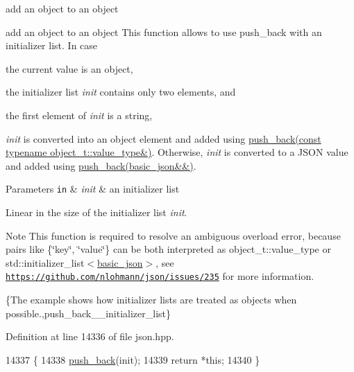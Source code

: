 add an object to an object 

add an object to an object This function allows to use {\ttfamily push\+\_\+back} with an initializer list. In case


\begin{DoxyEnumerate}
\item the current value is an object,
\item the initializer list {\itshape init} contains only two elements, and
\item the first element of {\itshape init} is a string,
\end{DoxyEnumerate}

{\itshape init} is converted into an object element and added using \hyperlink{classnlohmann_1_1basic__json_ae11a3a51782c058fff2f6550cdfb9b3c}{push\+\_\+back(const typename object\+\_\+t\+::value\+\_\+type\&)}. Otherwise, {\itshape init} is converted to a J\+S\+ON value and added using \hyperlink{classnlohmann_1_1basic__json_ac8e523ddc8c2dd7e5d2daf0d49a9c0d7}{push\+\_\+back(basic\+\_\+json\&\&)}.


\begin{DoxyParams}[1]{Parameters}
\mbox{\tt in}  & {\em init} & an initializer list\\
\hline
\end{DoxyParams}
Linear in the size of the initializer list {\itshape init}.

\begin{DoxyNote}{Note}
This function is required to resolve an ambiguous overload error, because pairs like {\ttfamily \{\char`\"{}key\char`\"{}, \char`\"{}value\char`\"{}\}} can be both interpreted as {\ttfamily object\+\_\+t\+::value\+\_\+type} or {\ttfamily std\+::initializer\+\_\+list$<$\hyperlink{classnlohmann_1_1basic__json}{basic\+\_\+json}$>$}, see \href{https://github.com/nlohmann/json/issues/235}{\tt https\+://github.\+com/nlohmann/json/issues/235} for more information.
\end{DoxyNote}
\{The example shows how initializer lists are treated as objects when possible.,push\+\_\+back\+\_\+\+\_\+initializer\+\_\+list\} 

Definition at line 14336 of file json.\+hpp.


\begin{DoxyCode}
14337     \{
14338         \hyperlink{classnlohmann_1_1basic__json_ac8e523ddc8c2dd7e5d2daf0d49a9c0d7}{push\_back}(init);
14339         \textcolor{keywordflow}{return} *\textcolor{keyword}{this};
14340     \}
\end{DoxyCode}
\mbox{\label{classnlohmann_1_1basic__json_aab256df8c5594ec693035822fa1e2904}} 
